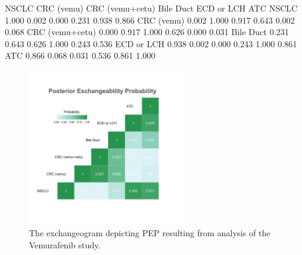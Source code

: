 %

\begin{Schunk}
	\begin{Soutput}
	                NSCLC CRC (vemu) CRC (vemu+cetu) Bile Duct ECD or LCH   ATC
	NSCLC           1.000      0.002           0.000     0.231      0.938 0.866
	CRC (vemu)      0.002      1.000           0.917     0.643      0.002 0.068
	CRC (vemu+cetu) 0.000      0.917           1.000     0.626      0.000 0.031
	Bile Duct       0.231      0.643           0.626     1.000      0.243 0.536
	ECD or LCH      0.938      0.002           0.000     0.243      1.000 0.861
	ATC             0.866      0.068           0.031     0.536      0.861 1.000
	\end{Soutput}
	\end{Schunk}
		
    	\begin{figure}[htbp!]
			\centering
			\includegraphics[width=0.6\textwidth]{basket_pep2.png}
			\caption{The exchangeogram depicting PEP resulting from analysis of the Vemurafenib study.}
			\label{excgrm}
		\end{figure}
		
